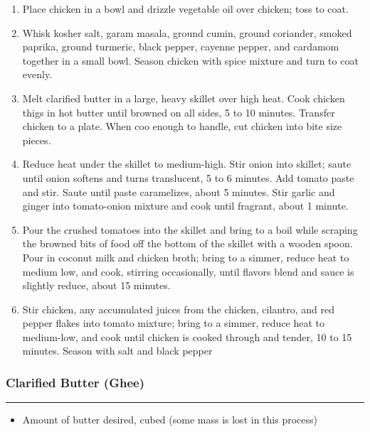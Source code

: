 \documentclass{article}
\begin{document}
\begin{enumerate}
    \item 
        Place chicken in a bowl and drizzle vegetable oil over chicken; toss to coat.
    \item
        Whisk kosher salt, garam masala, ground cumin, ground coriander, smoked paprika, ground turmeric, black pepper, cayenne pepper, and cardamom together in a small bowl. Season chicken with spice mixture and turn to coat evenly.
    \item
        Melt clarified butter in a large, heavy skillet over high heat. Cook chicken thigs in hot butter until browned on all sides, 5 to 10 minutes. Transfer chicken to a plate. When coo enough to handle, cut chicken into bite size pieces.
    \item
        Reduce heat under the skillet to medium-high. Stir onion into skillet; saute until onion softens and turns translucent, 5 to 6 minutes. Add tomato paste and stir. Saute until paste caramelizes, about 5 minutes. Stir garlic and ginger into tomato-onion mixture and cook until fragrant, about 1 minute.
    \item
        Pour the crushed tomatoes into the skillet and bring to a boil while scraping the browned bits of food off the bottom of the skillet with a wooden spoon. Pour in coconut milk and chicken broth; bring to a simmer, reduce heat to medium low, and cook, stirring occasionally, until flavors blend and sauce is slightly reduce, about 15 minutes.
    \item
        Stir chicken, any accumulated juices from the chicken, cilantro, and red pepper flakes into tomato mixture; bring to a simmer, reduce heat to medium-low, and cook until chicken is cooked through and tender, 10 to 15 minutes. Season with salt and black pepper
\end{enumerate}

\subsubsection{Clarified Butter (Ghee)}
\noindent\rule[0.5ex]{\linewidth}{0.5pt}

\begin{framed}
    \begin{itemize}
        \item Amount of butter desired, cubed (some mass is lost in this process)
    \end{itemize}
\end{framed}
\end{document}
